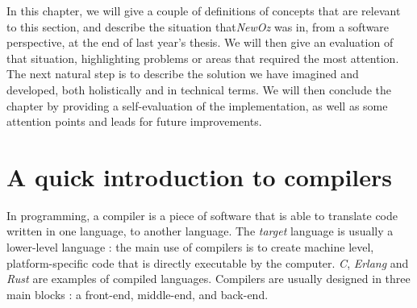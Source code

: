 In this chapter, we will give a couple of definitions of concepts that are relevant to this section, and describe the situation that\textit{NewOz} was in, from a software perspective, at the end of last year's thesis.
We will then give an evaluation of that situation, highlighting problems or areas that required the most attention.
The next natural step is to describe the solution we have imagined and developed, both holistically and in technical terms.
We will then conclude the chapter by providing a self-evaluation of the implementation, as well as some attention points and leads for future improvements.

\section{A quick introduction to compilers}\label{sec:ch3-compilers}
In programming, a compiler is a piece of software that is able to translate code written in one language, to another language.
The \textit{target} language is usually a lower-level language : the main use of compilers is to create machine level, platform-specific code that is directly executable by the computer.
\textit{C}, \textit{Erlang} and \textit{Rust} are examples of compiled languages.
Compilers are usually designed in three main blocks : a front-end, middle-end, and back-end.~\cite{wikiCompiler}\newline

